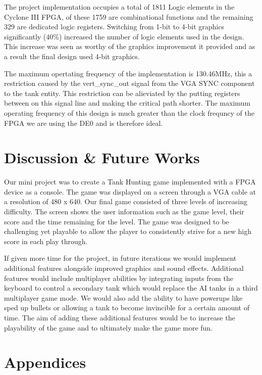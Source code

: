 \documentclass{article}
\begin{document}
The project implementation occupies a total of 1811 Logic elements in the Cyclone III FPGA, of these 1759 are combinational functions and the remaining 329 are dedicated logic registers. Switching from 1-bit to 4-bit graphics significantly (40\%) increased the number of logic elements used in the design. This increase was seen as worthy of the graphics improvement it provided and as a result the final design used 4-bit graphics.

The maximum opertating frequency of the implementation is 130.46MHz, this a restriction caused by the vert\_sync\_out signal from the VGA SYNC component to the tank entity. This restriction can be alieviated by the putting registers between on this signal line and making the critical path shorter. The maximum operating frequency of this design is much greater than the clock frequncy of the FPGA we are using the DE0 and is therefore ideal.

\section{Discussion \& Future Works}

Our mini project was to create a Tank Hunting game implemented with a FPGA device as a console. The game was displayed on a screen through a VGA cable at a resolution of 480 x 640. Our final game consisted of three levels of increasing difficulty. The screen shows the user information such as the game level, their score and the time remaining for the level. The game was designed to be challenging yet playable to allow the player to consistently strive for a new high score in each play through.

If given more time for the project, in future iterations we would implement additional features alongside improved graphics and sound effects. Additional features would include multiplayer abilities by integrating inputs from the keyboard to control a secondary tank which would replace the AI tanks in a third multiplayer game mode. We would also add the ability to have powerups like sped up bullets or allowing a tank to become invincible for a certain amount of time. The aim of adding these additional features would be to increase the playability of the game and to ultimately make the game more fun.

\clearpage

\section{Appendices}
\end{document}

